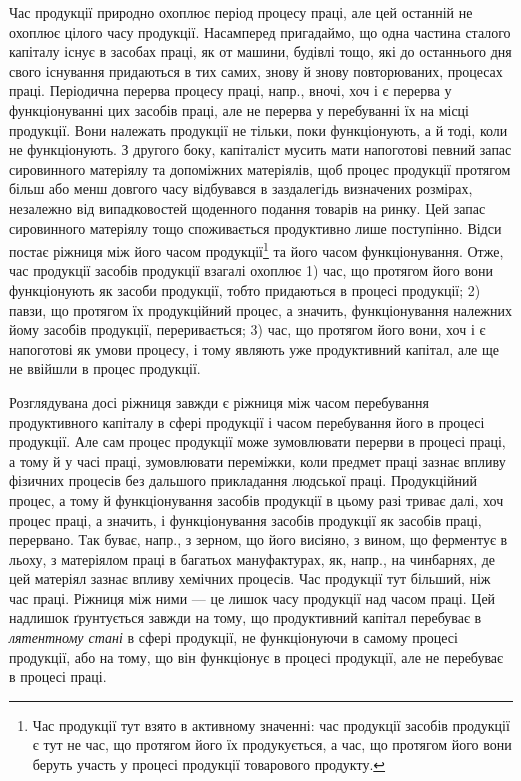 Час продукції природно охоплює період процесу праці, але цей
останній не охоплює цілого часу продукції. Насамперед пригадаймо, що
одна частина сталого капіталу існує в засобах праці, як от машини,
будівлі тощо, які до останнього дня свого існування придаються в тих
самих, знову й знову повторюваних, процесах праці. Періодична перерва
процесу праці, напр., вночі, хоч і є перерва у функціонуванні цих засобів
праці, але не перерва у перебуванні їх на місці продукції. Вони
належать продукції не тільки, поки функціонують, а й тоді, коли не функціонують.
З другого боку, капіталіст мусить мати напоготові певний запас
сировинного матеріялу та допоміжних матеріялів, щоб процес продукції
протягом більш або менш довгого часу відбувався в заздалегідь визначених
розмірах, незалежно від випадковостей щоденного подання товарів
на ринку. Цей запас сировинного матеріялу тощо споживається продуктивно
лише поступінно. Відси постає ріжниця між його часом продукції\footnote{
Час продукції тут взято в активному значенні: час продукції засобів продукції
є тут не час, що протягом його їх продукується, а час, що протягом його
вони беруть участь у процесі продукції товарового продукту.
}
та його часом функціонування. Отже, час продукції засобів
продукції взагалі охоплює 1) час, що протягом його вони функціонують
як засоби продукції, тобто придаються в процесі продукції;
2) павзи, що протягом їх продукційний процес, а значить, функціонування
належних йому засобів продукції, переривається; 3) час, що
протягом його вони, хоч і є напоготові як умови процесу, і тому являють
уже продуктивний капітал, але ще не ввійшли в процес продукції.

Розглядувана досі ріжниця завжди є ріжниця між часом перебування
продуктивного капіталу в сфері продукції і часом перебування його в
процесі продукції. Але сам процес продукції може зумовлювати перерви
в процесі праці, а тому й у часі праці, зумовлювати переміжки, коли
предмет праці зазнає впливу фізичних процесів без дальшого прикладання
людської праці. Продукційний процес, а тому й функціонування засобів
продукції в цьому разі триває далі, хоч процес праці, а значить, і функціонування
засобів продукції як засобів праці, перервано. Так буває, напр.,
з зерном, що його висіяно, з вином, що ферментує в льоху, з матеріялом
праці в багатьох мануфактурах, як, напр., на чинбарнях, де цей матеріял
зазнає впливу хемічних процесів. Час продукції тут більший, ніж час
праці. Ріжниця між ними — це лишок часу продукції над часом праці.
Цей надлишок ґрунтується завжди на тому, що продуктивний капітал
перебуває в \emph{лятентному стані} в сфері продукції, не функціонуючи в
самому процесі продукції, або на тому, що він функціонує в процесі
продукції, але не перебуває в процесі праці.

